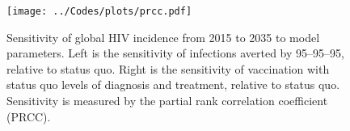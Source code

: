 \documentclass{article}
\begin{document}
\begin{figure}
   \centering
   \texttt{[image: ../Codes/plots/prcc.pdf]}
   \caption{Sensitivity of global HIV incidence from 2015 to 2035 to
     model parameters.  Left is the sensitivity of infections averted
     by 95--95--95, relative to status quo.  Right is the sensitivity
     of vaccination with status quo levels of diagnosis and treatment,
     relative to status quo.  Sensitivity is measured by the partial
     rank correlation coefficient (PRCC).}
   \label{PRCCs}
\end{figure}
\end{document}
